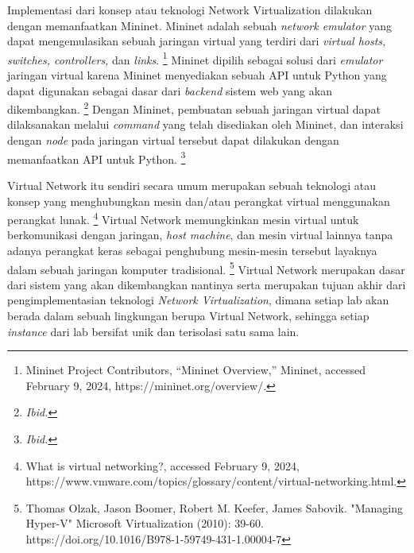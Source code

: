 Implementasi dari konsep atau teknologi Network Virtualization dilakukan dengan memanfaatkan Mininet. Mininet adalah sebuah \textit{network emulator} yang 
dapat mengemulasikan sebuah jaringan virtual yang terdiri dari \textit{virtual hosts, switches, controllers,} dan \textit{links}. 
\footnote{Mininet Project Contributors, “Mininet Overview,” Mininet, accessed February 9, 2024, https://mininet.org/overview/.}
Mininet dipilih sebagai solusi dari \textit{emulator} jaringan virtual karena Mininet menyediakan sebuah API untuk Python yang dapat digunakan
sebagai dasar dari \textit{backend} sistem web yang akan dikembangkan. 
\footnote{\textit{Ibid.}}
Dengan Mininet, pembuatan sebuah jaringan virtual dapat dilaksanakan melalui \textit{command} yang telah disediakan oleh Mininet, dan interaksi dengan \textit{node} 
pada jaringan virtual tersebut dapat dilakukan dengan memanfaatkan API untuk Python.
\footnote{\textit{Ibid.}}
\par

Virtual Network itu sendiri secara umum merupakan sebuah teknologi atau konsep yang menghubungkan mesin dan/atau perangkat virtual 
menggunakan perangkat lunak. 
\footnote{What is virtual networking?, accessed February 9, 2024, https://www.vmware.com/topics/glossary/content/virtual-networking.html.} 
Virtual Network memungkinkan mesin virtual untuk berkomunikasi dengan jaringan, \textit{host machine}, dan mesin virtual 
lainnya tanpa adanya perangkat keras sebagai penghubung mesin-mesin tersebut layaknya dalam sebuah jaringan komputer tradisional. 
\footnote{Thomas Olzak, Jason Boomer, Robert M. Keefer, James Sabovik. "Managing Hyper-V" Microsoft Virtualization (2010): 39-60. https://doi.org/10.1016/B978-1-59749-431-1.00004-7} 
Virtual Network merupakan dasar dari sistem yang akan dikembangkan nantinya serta merupakan tujuan akhir dari pengimplementasian teknologi \textit{Network Virtualization},
dimana setiap lab akan berada dalam sebuah lingkungan berupa Virtual Network, sehingga setiap \textit{instance} dari lab bersifat unik dan terisolasi satu sama lain.
\par
